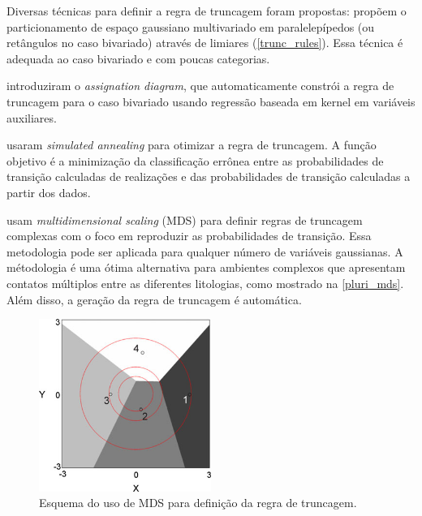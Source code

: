 Diversas técnicas para definir a regra de truncagem foram propostas:  propõem o particionamento de espaço gaussiano multivariado em paralelepípedos (ou retângulos no caso bivariado) através de limiares (\autoref{trunc_rules}). Essa técnica é adequada ao caso bivariado e com poucas categorias.

 introduziram o \textit{assignation diagram}, que automaticamente constrói a regra de truncagem para o caso bivariado usando regressão baseada em kernel em variáveis auxiliares.

 usaram \textit{simulated annealing} para otimizar a regra de truncagem. A função objetivo é a minimização da classificação errônea entre as probabilidades de transição calculadas de realizações e das probabilidades de transição calculadas a partir dos dados.

 usam \textit{multidimensional scaling} (MDS) para definir regras de truncagem complexas com o foco em reproduzir as probabilidades de transição. Essa metodologia pode ser aplicada para qualquer número de variáveis gaussianas. A métodologia é uma ótima alternativa para ambientes complexos que apresentam contatos múltiplos entre as diferentes litologias, como mostrado na \autoref{pluri_mds}. Além disso, a geração da regra de truncagem é automática.

\begin{figure}[H]
	\caption{\label{pluri_mds}Esquema do uso de MDS para definição da regra de truncagem.}
	\begin{center}
		\includegraphics[width=0.5\textwidth]{capitulo_3/pluri_mds.png}
	\end{center}
\end{figure}

